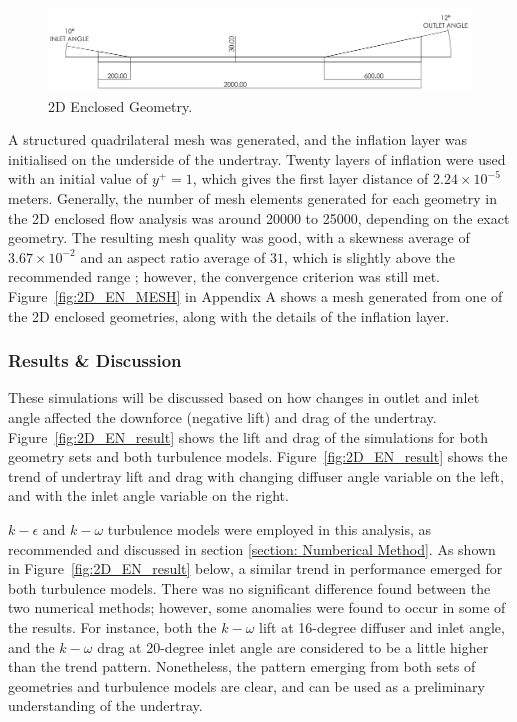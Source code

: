 \begin{figure}[!ht]
    \centering
    \includegraphics[scale=0.18]{Figures/2D_EN/2D_EN_D.PNG}
    \caption{2D Enclosed Geometry.}
    \label{fig:2D_EN_Geom}
\end{figure}
  
\noindent A structured quadrilateral mesh was generated, and the inflation layer was initialised on the underside of the undertray. Twenty layers of inflation were used with an initial value of $y^+ = 1$, which gives the first layer distance of $2.24 \times 10^{-5}$ meters. Generally, the number of mesh elements generated for each geometry in the 2D enclosed flow analysis was around 20000 to 25000, depending on the exact geometry. The resulting mesh quality was good, with a skewness average of $3.67 \times 10^{-2}$ and an aspect ratio average of $31$, which is slightly above the recommended range \cite{Lanfrit2005BestFLUENT}; however, the convergence criterion was still met. Figure~\ref{fig:2D_EN_MESH} in Appendix A shows a mesh generated from one of the 2D enclosed geometries, along with the details of the inflation layer.

\subsubsection{Results \& Discussion}
These simulations will be discussed based on how changes in outlet and inlet angle affected the downforce (negative lift) and drag of the undertray. Figure~\ref{fig:2D_EN_result} shows the lift and drag of the simulations for both geometry sets and both turbulence models. Figure~\ref{fig:2D_EN_result} shows the trend of undertray lift and drag with changing diffuser angle variable on the left, and with the inlet angle variable on the right. 

\noindent $k-\epsilon$ and $k-\omega$ turbulence models were employed in this analysis, as recommended\cite{} and discussed in section \ref{section: Numberical Method}. As shown in Figure~\ref{fig:2D_EN_result} below, a similar trend in performance emerged for both turbulence models. There was no significant difference found between the two numerical methods; however, some anomalies were found to occur in some of the results. For instance, both the $k-\omega$ lift at 16-degree diffuser and inlet angle, and the $k-\omega$ drag at 20-degree inlet angle are considered to be a little higher than the trend pattern. Nonetheless, the pattern emerging from both sets of geometries and turbulence models are clear, and can be used as a preliminary understanding of the undertray.

